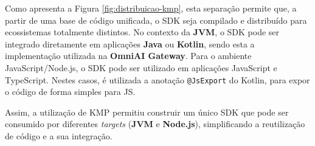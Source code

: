     Como apresenta a Figura \ref{fig:distribuicao-kmp}, esta separação permite que, a partir de uma base de código unificada, o SDK seja compilado e distribuído para ecossistemas totalmente distintos. 
    No contexto da \textbf{JVM}, o SDK pode ser integrado diretamente em aplicações \textbf{Java} ou \textbf{Kotlin}, sendo esta a implementação utilizada na \textbf{OmniAI Gateway}.
    Para o ambiente JavaScript/Node.js, o SDK pode ser utilizado em aplicações JavaScript e TypeScript. Nestes casos, é utilizada a anotação \texttt{@JsExport} do Kotlin, para expor o código de forma simples para JS.

    Assim, a utilização de KMP permitiu construir um único SDK que pode ser consumido por diferentes \textit{targets} (\textbf{JVM} e \textbf{Node.js}), simplificando a reutilização de código e a sua integração.
